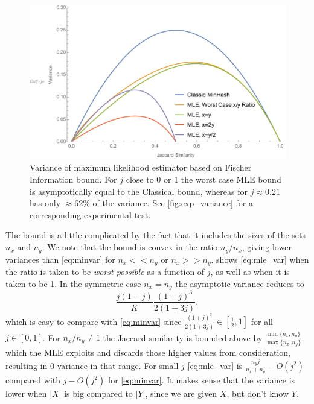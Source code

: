 \begin{figure}
\includegraphics[trim=30 0 0 0,clip,width=\linewidth]{figures/mle_variance2}
\caption{Variance of maximum likelihood estimator based on Fischer Information bound.
For $j$ close to 0 or 1 the worst case MLE bound is asymptotically equal to the Classical bound, whereas for $j\approx 0.21$ has only $\approx 62\%$ of the variance.
See \cref{fig:exp_variance} for a corresponding experimental test.
}
\label{fig:mle_variance}
\end{figure}

The bound is a little complicated by the fact that it includes the sizes of the sets $n_x$ and $n_y$.
We note that the bound is convex in the ratio $n_y/n_x$, giving lower variances than \cref{eq:minvar} for $n_x<\!<n_y$ or $n_x >\!> n_y$.
 shows \cref{eq:mle_var} when the ratio is taken to be \emph{worst possible} as a function of $j$, as well as when it is taken to be 1.
In the symmetric case $n_x=n_y$ the asymptotic variance reduces to
\[
   \frac{j(1-j)}{K}\frac{(1+j)^3}{2(1+3j)},
\]
which is easy to compare with \cref{eq:minvar} since $\frac{(1+j)^3}{2(1+3j)} \in [\frac12,1]$ for all $j\in[0,1]$.
For $n_x/n_y\neq1$ the Jaccard similarity is bounded above by $\frac{\min\{n_x,n_y\}}{\max\{n_x,n_y\}}$ which the MLE exploits and discards those higher values from consideration, resulting in 0 variance in that range.
For small $j$ \cref{eq:mle_var} is $\frac{n_y j}{n_x+n_y}-O(j^2)$ compared with $j-O(j^2)$ for \cref{eq:minvar}.
It makes sense that the variance is lower when $|X|$ is big compared to $|Y|$, since we are given $X$, but don't know $Y$.

